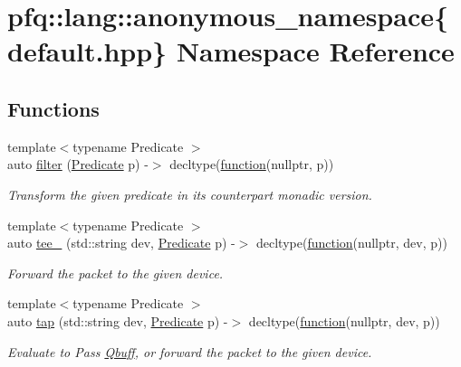 \hypertarget{namespacepfq_1_1lang_1_1anonymous__namespace_02default_8hpp_03}{}\section{pfq\+:\+:lang\+:\+:anonymous\+\_\+namespace\{default.\+hpp\} Namespace Reference}
\label{namespacepfq_1_1lang_1_1anonymous__namespace_02default_8hpp_03}
\subsection*{Functions}
\begin{DoxyCompactItemize}
\item 
{\footnotesize template$<$typename Predicate $>$ }\\auto \hyperlink{namespacepfq_1_1lang_1_1anonymous__namespace_02default_8hpp_03_ab6609fc892c99d59d772832ff2ba8beb}{filter} (\hyperlink{structpfq_1_1lang_1_1Predicate}{Predicate} p) -\/$>$ decltype(\hyperlink{namespacepfq_1_1lang_a1a4638059d700ae08d0ca63886ff2bb3}{function}(nullptr, p))
\begin{DoxyCompactList}\small\item\em Transform the given predicate in its counterpart monadic version. \end{DoxyCompactList}\item 
{\footnotesize template$<$typename Predicate $>$ }\\auto \hyperlink{namespacepfq_1_1lang_1_1anonymous__namespace_02default_8hpp_03_a94260a88b04b7d42e471b954ba48d617}{tee\+\_\+} (std\+::string dev, \hyperlink{structpfq_1_1lang_1_1Predicate}{Predicate} p) -\/$>$ decltype(\hyperlink{namespacepfq_1_1lang_a1a4638059d700ae08d0ca63886ff2bb3}{function}(nullptr, dev, p))
\begin{DoxyCompactList}\small\item\em Forward the packet to the given device. \end{DoxyCompactList}\item 
{\footnotesize template$<$typename Predicate $>$ }\\auto \hyperlink{namespacepfq_1_1lang_1_1anonymous__namespace_02default_8hpp_03_aa8b81192a22fb62555e19afe4560e326}{tap} (std\+::string dev, \hyperlink{structpfq_1_1lang_1_1Predicate}{Predicate} p) -\/$>$ decltype(\hyperlink{namespacepfq_1_1lang_a1a4638059d700ae08d0ca63886ff2bb3}{function}(nullptr, dev, p))
\begin{DoxyCompactList}\small\item\em Evaluate to {\ttfamily Pass} \hyperlink{structpfq_1_1lang_1_1Qbuff}{Qbuff}, or forward the packet to the given device. \end{DoxyCompactList}\item 

\end{DoxyCompactItemize}
